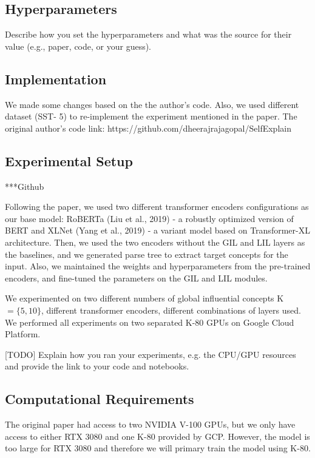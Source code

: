 \documentclass{article}
\begin{document}
\subsection{Hyperparameters}
Describe how you set the hyperparameters and what was the source for their value (e.g., paper, code, or your guess). 

\subsection{Implementation}

We made some changes based on the the author's code. Also, we used different dataset (SST- 5) to re-implement the experiment mentioned in the paper. The original author's code link: https://github.com/dheerajrajagopal/SelfExplain

\subsection{Experimental Setup}

***Github

Following the paper, we used two different transformer encoders configurations as our base model: RoBERTa (Liu et al., 2019) - a robustly optimized version of BERT and XLNet (Yang et al., 2019) - a variant model based on Transformer-XL architecture. Then, we used the two encoders without the GIL and LIL layers as the baselines, and we generated parse tree to extract target concepts for the input. Also, we maintained the weights and hyperparameters from the pre-trained encoders, and fine-tuned the parameters on the GIL and LIL modules. 

We experimented on two different numbers of global
influential concepts K $= \{5, 10\}$, different transformer encoders, different combinations of layers used. We performed all experiments on two separated K-80 GPUs on Google Cloud Platform. 


[TODO] Explain how you ran your experiments, e.g. the CPU/GPU resources and provide the link to your code and notebooks. 

\subsection{Computational Requirements}

The original paper had access to two NVIDIA V-100 GPUs, but we only have access to either 
RTX 3080 and one K-80 provided by GCP. However, the model is too large for RTX 3080 and therefore we will 
primary train the model using K-80.
\end{document}
